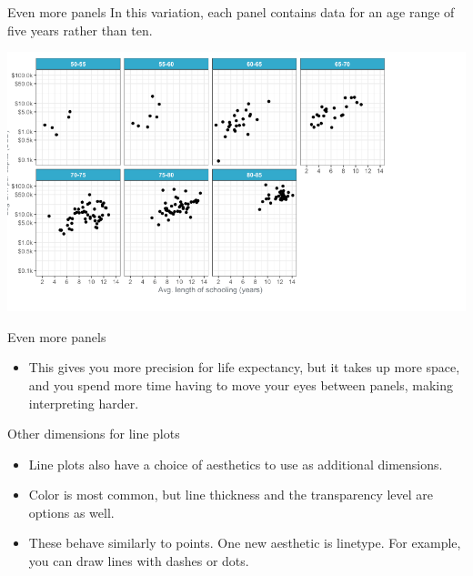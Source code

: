 \documentclass[
  ignorenonframetext,
]{beamer}
\providecommand{\tightlist}{%
  \setlength{\itemsep}{0pt}\setlength{\parskip}{0pt}}
\begin{document}
\begin{frame}{Even more panels}
\label{even-more-panels}
In this variation, each panel contains data for an age range of five
years rather than ten.

\includegraphics{../images/im71.png}
\end{frame}

\begin{frame}{Even more panels}
\label{even-more-panels-1}
\begin{itemize}
\tightlist
\item
  This gives you more precision for life expectancy, but it takes up
  more space, and you spend more time having to move your eyes between
  panels, making interpreting harder.
\end{itemize}
\end{frame}

\begin{frame}{Other dimensions for line plots}
\label{other-dimensions-for-line-plots}
\begin{itemize}
\item
  Line plots also have a choice of aesthetics to use as additional
  dimensions.
\item
  Color is most common, but line thickness and the transparency level
  are options as well.
\item
  These behave similarly to points. One new aesthetic is linetype. For
  example, you can draw lines with dashes or dots.
\end{itemize}
\end{frame}
\end{document}
